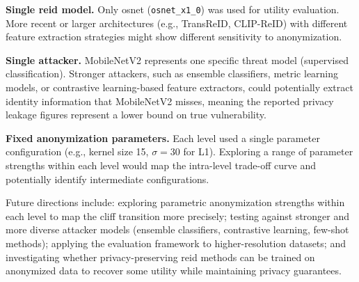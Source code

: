 \textbf{Single \acrshort{reid} model.} Only \acrshort{osnet} (\texttt{osnet\_x1\_0}) was used for utility evaluation. More recent or larger architectures (e.g., TransReID, CLIP-ReID) with different feature extraction strategies might show different sensitivity to anonymization.

\textbf{Single attacker.} MobileNetV2 represents one specific threat model (supervised classification). Stronger attackers, such as ensemble classifiers, metric learning models, or contrastive learning-based feature extractors, could potentially extract identity information that MobileNetV2 misses, meaning the reported privacy leakage figures represent a lower bound on true vulnerability.

\textbf{Fixed anonymization parameters.} Each level used a single parameter configuration (e.g., kernel size 15, $\sigma = 30$ for L1). Exploring a range of parameter strengths within each level would map the intra-level trade-off curve and potentially identify intermediate configurations.

Future directions include: exploring parametric anonymization strengths within each level to map the cliff transition more precisely; testing against stronger and more diverse attacker models (ensemble classifiers, contrastive learning, few-shot methods); applying the evaluation framework to higher-resolution datasets; and investigating whether privacy-preserving \acrshort{reid} methods can be trained on anonymized data to recover some utility while maintaining privacy guarantees.
